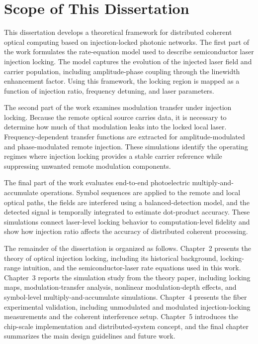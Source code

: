 \section{Scope of This Dissertation}

This dissertation develops a theoretical framework for distributed coherent optical computing based on injection-locked photonic networks. The first part of the work formulates the rate-equation model used to describe semiconductor laser injection locking. The model captures the evolution of the injected laser field and carrier population, including amplitude-phase coupling through the linewidth enhancement factor. Using this framework, the locking region is mapped as a function of injection ratio, frequency detuning, and laser parameters.

The second part of the work examines modulation transfer under injection locking. Because the remote optical source carries data, it is necessary to determine how much of that modulation leaks into the locked local laser. Frequency-dependent transfer functions are extracted for amplitude-modulated and phase-modulated remote injection. These simulations identify the operating regimes where injection locking provides a stable carrier reference while suppressing unwanted remote modulation components.

The final part of the work evaluates end-to-end photoelectric multiply-and-accumulate operations. Symbol sequences are applied to the remote and local optical paths, the fields are interfered using a balanced-detection model, and the detected signal is temporally integrated to estimate dot-product accuracy. These simulations connect laser-level locking behavior to computation-level fidelity and show how injection ratio affects the accuracy of distributed coherent processing.

The remainder of the dissertation is organized as follows. Chapter~2 presents the theory of optical injection locking, including its historical background, locking-range intuition, and the semiconductor-laser rate equations used in this work. Chapter~3 reports the simulation study from the theory paper, including locking maps, modulation-transfer analysis, nonlinear modulation-depth effects, and symbol-level multiply-and-accumulate simulations. Chapter~4 presents the fiber experimental validation, including unmodulated and modulated injection-locking measurements and the coherent interference setup. Chapter~5 introduces the chip-scale implementation and distributed-system concept, and the final chapter summarizes the main design guidelines and future work.
